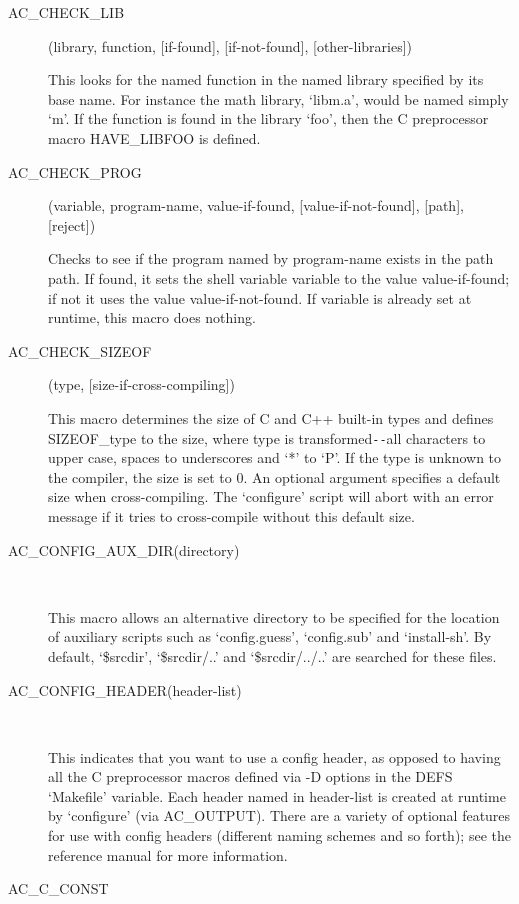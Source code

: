 \begin{description}
\item[AC\_{}CHECK\_{}LIB](library, function, [if-found], [if-not-found], [other-libraries])

    This looks for the named function in the named library specified by its base name. For instance the math library, `libm.a', would be named simply `m'. If the function is found in the library `foo', then the C preprocessor macro HAVE\_{}LIBFOO is defined.

\item[AC\_{}CHECK\_{}PROG](variable, program-name, value-if-found, [value-if-not-found], [path], [reject])

    Checks to see if the program named by program-name exists in the path path. If found, it sets the shell variable variable to the value value-if-found; if not it uses the value value-if-not-found. If variable is already set at runtime, this macro does nothing.

\item[AC\_{}CHECK\_{}SIZEOF](type, [size-if-cross-compiling])

    This macro determines the size of C and C++ built-in types and defines SIZEOF\_{}type to the size, where type is transformed\verb+--+all characters to upper case, spaces to underscores and `*' to `P'. If the type is unknown to the compiler, the size is set to 0. An optional argument specifies a default size when cross-compiling. The `configure' script will abort with an error message if it tries to cross-compile without this default size.

\item[AC\_{}CONFIG\_{}AUX\_{}DIR(directory)]
\

    This macro allows an alternative directory to be specified for the location of auxiliary scripts such as `config.guess', `config.sub' and `install-sh'. By default, `\$srcdir', `\$srcdir/..' and `\$srcdir/../..' are searched for these files.

\item[AC\_{}CONFIG\_{}HEADER(header-list)]
\

This indicates that you want to use a config header, as opposed to having 
all the C preprocessor macros defined via -D options in the 
DEFS `Makefile' variable. Each header named in header-list is created 
at runtime by `configure' (via AC\_{}OUTPUT). There are a variety of 
optional features for use with config headers (different naming schemes 
and so forth); see the reference manual for more information.

\item[AC\_{}C\_{}CONST]
\


\end{description}
